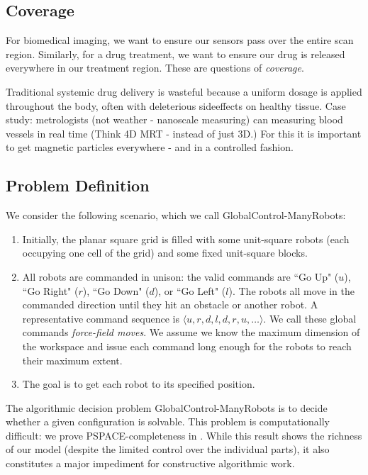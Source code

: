 \documentclass[letterpaper, 10 pt, conference]{ieeeconf}
\begin{document}
  
  
  \subsection{Coverage}\label{sec:Coverage}

 
  
  For biomedical imaging, we want to ensure our sensors pass over the entire scan region.  Similarly, for a drug treatment, we want to ensure our drug is released everywhere in our treatment region.  These are questions of \emph{coverage}.
  
  Traditional systemic drug delivery is wasteful because a uniform dosage is applied throughout the body, often with deleterious sideeffects on healthy tissue.
   Case study:  metrologists (not weather - nanoscale measuring) can measuring blood vessels in real time (Think 4D MRT - instead of just 3D.) For this it is important to get magnetic particles everywhere - and in a controlled fashion. 
  
    
  \subsection{Problem Definition}\label{subsec:GeneralProblemDefinition}
We consider the following scenario, which we call {\sc GlobalControl-ManyRobots}:
    \begin{enumerate}
\item Initially, the planar square grid is filled with some unit-square robots (each occupying one cell of the grid)  and some fixed unit-square blocks.
\item All robots are commanded in unison: the valid commands are  ``Go Up" ($u$), ``Go Right" ($r$), ``Go Down" ($d$), or ``Go Left" ($l$).  The robots all move in the commanded direction until they hit an obstacle or another robot.  A representative command sequence is $\langle u,r,d,l,d,r,u,\ldots\rangle$. We call these global commands \emph{force-field moves}. We assume we know the maximum dimension of the workspace and issue each command long enough for the robots to reach their maximum extent.
\item The goal is to get
each robot to its specified position.
\end{enumerate}
   The algorithmic decision problem {\sc GlobalControl-ManyRobots}  is to decide whether a given configuration is solvable.
This problem is computationally difficult: we prove PSPACE-completeness in \cite{Becker2014}. While this result shows
the richness of our model (despite the limited control over the individual parts), it also constitutes
a major impediment for constructive algorithmic work.
\end{document}
